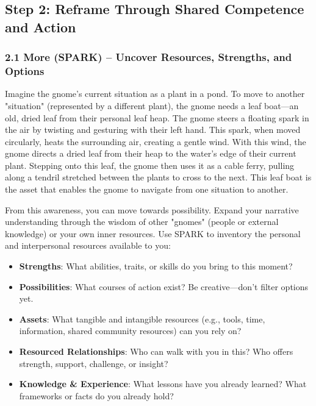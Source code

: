 \documentclass{article}
\begin{document}
\subsection{Step 2: Reframe Through Shared Competence and Action}

\subsubsection{2.1 More (SPARK) – Uncover Resources, Strengths, and Options}
Imagine the gnome's current situation as a plant in a pond. To move to another "situation" (represented by a different plant), the gnome needs a leaf boat—an old, dried leaf from their personal leaf heap. The gnome steers a floating spark in the air by twisting and gesturing with their left hand. This spark, when moved circularly, heats the surrounding air, creating a gentle wind. With this wind, the gnome directs a dried leaf from their heap to the water’s edge of their current plant. Stepping onto this leaf, the gnome then uses it as a cable ferry, pulling along a tendril stretched between the plants to cross to the next. This leaf boat is the asset that enables the gnome to navigate from one situation to another.

From this awareness, you can move towards possibility. Expand your narrative understanding through the wisdom of other "gnomes" (people or external knowledge) or your own inner resources. Use SPARK to inventory the personal and interpersonal resources available to you:
\begin{itemize}[noitemsep,topsep=0pt]
    \item \textbf{Strengths}: What abilities, traits, or skills do you bring to this moment?
    \item \textbf{Possibilities}: What courses of action exist? Be creative—don't filter options yet.
    \item \textbf{Assets}: What tangible and intangible resources (e.g., tools, time, information, shared community resources) can you rely on?
    \item \textbf{Resourced Relationships}: Who can walk with you in this? Who offers strength, support, challenge, or insight?
    \item \textbf{Knowledge \& Experience}: What lessons have you already learned? What frameworks or facts do you already hold?
\end{itemize}
\end{document}
